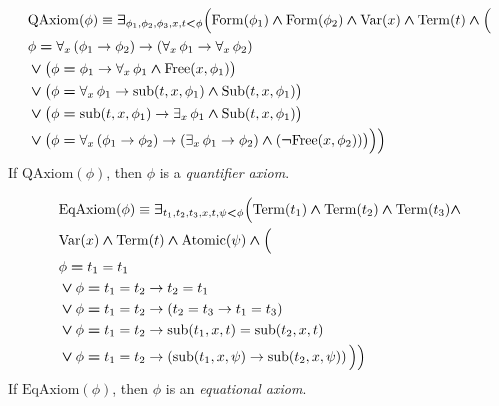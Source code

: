 \documentclass[10pt]{amsart}
\newcommand{\mexists}{\boldsymbol{\exists}}
\newcommand{\mand}{\boldsymbol{\wedge}}
\newcommand{\mor}{\boldsymbol{\vee}}
\newcommand{\mneg}{\boldsymbol{\neg}}
\newcommand{\mle}{\boldsymbol{<}}
\newcommand{\meq}{\boldsymbol{=}}
\begin{document}
\begin{definition}
$$
\begin{aligned}[t]
&\mathrm{QAxiom}(\phi) \equiv \mexists_{\phi_{\rm{1}},\phi_{\rm{2}},\phi_{\rm{3}},x,t \mle \phi}\Bigl(\mathrm{Form}(\phi_{\rm{1}})\mand \mathrm{Form}(\phi_{\rm{2}}) \mand \mathrm{Var}(x) \mand \mathrm{Term}(t) \mand \Bigl(\\ 
&\begin{aligned}[t]
&\phi \meq \forall_x \left(\phi_{\rm{1}} \ra \phi_{\rm{2}}\right) \ra \left(\forall_x\,\phi_{\rm{1}} \ra \forall_x\,\phi_{\rm{2}}\right)\\
&\mor \bigl(\phi \meq \phi_{\rm{1}} \ra \forall_x\,\phi_{\rm{1}} \mand \mathrm{Free}(x,\phi_{\rm{1}})\bigr) \\
&\mor \bigl(\phi \meq \forall_x\,\phi_{\rm{1}} \ra \mathrm{sub}(t,x,\phi_{\rm{1}}) \mand \mathrm{Sub}(t,x,\phi_{\rm{1}})\bigr)\\
&\mor \bigl(\phi \meq \mathrm{sub}(t,x,\phi_{\rm{1}}) \ra \exists_x\,\phi_{\rm{1}} \mand \mathrm{Sub}(t,x,\phi_{\rm{1}})\bigr)\\
&\mor \bigl(\phi \meq \forall_x\left(\phi_{\rm{1}} \ra \phi_{\rm{2}}\right) \ra \left(\exists_x\,\phi_{\rm{1}} \ra \phi_{\rm{2}}\right) \mand \left(\mneg \mathrm{Free}(x,\phi_{\rm{2}})\right)\bigr)\Bigr)\Bigr)\\
\end{aligned}
\end{aligned}
$$
If $\mathrm{QAxiom}(\phi)$, then $\phi$ is a \textit{quantifier axiom}.
\end{definition}

\begin{definition}
$$
\begin{aligned}[t]
&\mathrm{EqAxiom}(\phi) \equiv \mexists_{t_{\rm{1}},t_{\rm{2}},t_{\rm{3}},x,t,\psi \mle \phi}\Bigl(\mathrm{Term}(t_{\rm{1}})\mand \mathrm{Term}(t_{\rm{2}}) \mand \mathrm{Term}(t_{\rm{3}}) \mand \\
&\mathrm{Var}(x) \mand \mathrm{Term}(t) \mand \mathrm{Atomic}(\psi) \mand \Bigl(\\
&\begin{aligned}[t]
&\phi \meq t_{\rm{1}}=t_{\rm{1}}\\
&\mor \phi \meq t_{\rm{1}} = t_{\rm{2}} \ra t_{\rm{2}} = t_{\rm{1}} \\
&\mor \phi \meq t_{\rm{1}} = t_{\rm{2}} \ra \left(t_{\rm{2}} = t_{\rm{3}} \ra t_{\rm{1}} = t_{\rm{3}}\right)\\
&\mor \phi \meq t_{\rm{1}} = t_{\rm{2}} \ra \mathrm{sub}(t_{\rm{1}},x,t) = \mathrm{sub}(t_{\rm{2}},x,t)\\
&\mor \phi \meq t_{\rm{1}} = t_{\rm{2}} \ra \left(\mathrm{sub}(t_{\rm{1}},x,\psi) \ra \mathrm{sub}(t_{\rm{2}},x,\psi)\right)\,\Bigr)\Bigr)\\
\end{aligned}
\end{aligned}
$$
If $\mathrm{EqAxiom}(\phi)$, then $\phi$ is an \textit{equational axiom}.
\end{definition}
\end{document}
